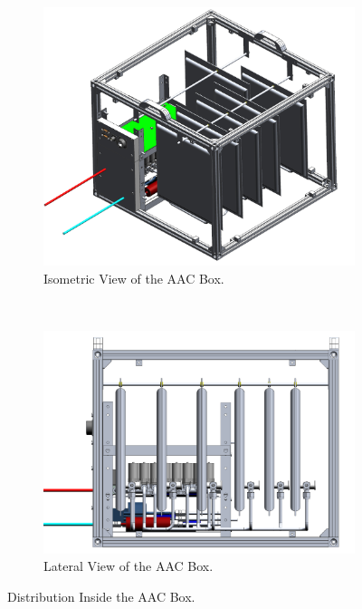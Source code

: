 \begin{figure}[H]
    \centering
    \begin{subfigure}[b]{0.47\textwidth}
        \includegraphics[width=\textwidth]{4-experiment-design/img/Mechanical/AAC_isometric_view.png}
         \caption{Isometric View of the AAC Box.}
    \label{iso_aac}
    \end{subfigure}
    ~
    \begin{subfigure}[b]{0.47\textwidth}
        \centering
         \includegraphics[width=\textwidth]{4-experiment-design/img/Mechanical/AAC_lateral_view.png}
        \caption{Lateral View of the AAC Box.}
        \label{lateral_aac}
        \end{subfigure}
    \caption{Distribution Inside the AAC Box.}
    \label{fig:Distribution-AAC}
\end{figure}

